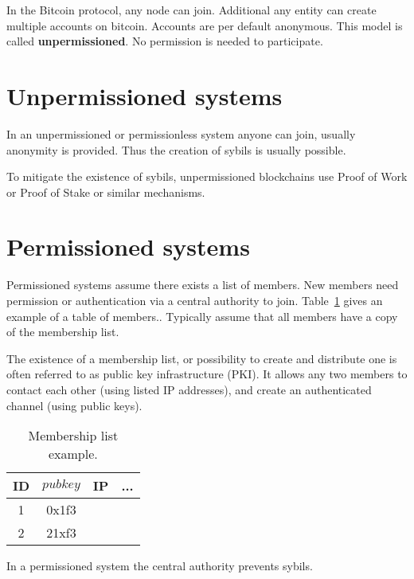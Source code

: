 
\noindent
In the Bitcoin protocol, any node can join. Additional any entity can create multiple accounts on bitcoin. Accounts are per default anonymous.
This model is called \textbf{unpermissioned}. No permission is needed to participate. 

\section{Unpermissioned systems}
In an unpermissioned or permissionless system anyone can join, usually anonymity is provided.
Thus the creation of sybils is usually possible.

To mitigate the existence of sybils, unpermissioned blockchains use Proof of Work or Proof of Stake or similar mechanisms.

\section{Permissioned systems}
Permissioned systems assume there exists a list of members.
New members need permission or authentication via a central authority to join. 
Table~\ref{tab:members} gives an example of a table of members.. Typically assume that all members have a copy of the membership list. 

The existence of a membership list, or possibility to create and distribute one
is often referred to as public key infrastructure (PKI).
It allows any two members to contact each other (using listed IP addresses), and create an authenticated channel (using public keys).

\begin{table}[h]
	\centering
	\begin{tabular}{| c | c | c | c | }
		\hline
		ID & $pubkey$ & IP & ... \\
		\hline
		1 & 0x1f3 & &\\
		\hline
		2 & 21xf3 & &\\
		\hline
		
	\end{tabular}
	\caption{Membership list example. \label{tab:members}}
\end{table}

In a permissioned system the central authority prevents sybils.

